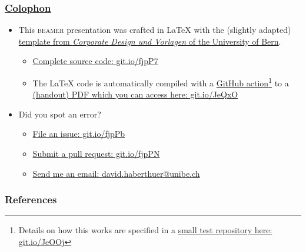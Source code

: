 \begin{frame}
	\frametitle{\href{https://en.wikipedia.org/wiki/Colophon_(publishing)}{Colophon}}
	\begin{itemize}
		\item This \textsc{beamer} presentation was crafted in \LaTeX\xspace with the (slightly adapted) \href{http://intern.unibe.ch/dienstleistungen/corporate_design_und_vorlagen/praesentationen/index_ger.html}{template from \emph{Corporate Design und Vorlagen} of the University of Bern}.
		\begin{itemize}
			\item \href{https://github.com/habi/lecture.microtomography/}{Complete source code: git.io/fjpP7}
			\item The \LaTeX\xspace code is automatically compiled with a \href{https://github.com/actions}{GitHub action}\footnote{Details on how this works are specified in a \href{https://github.com/habi/latex-test/}{small test repository here: git.io/JeOOj}} to a \href{https://habi.github.io/Lecture.Microtomography/XRayMicroTomography.Handout.pdf}{(handout) PDF which you can access here: git.io/JeQxO}
		\end{itemize}
		\item Did you spot an error?
		\begin{itemize}
			\item \href{https://github.com/habi/lecture.microtomography/issues}{File an issue: git.io/fjpPb}
			\item \href{https://github.com/habi/lecture.microtomography/pulls}{Submit a pull request: git.io/fjpPN}
			\item \href{mailto:david.haberthuer@unibe.ch?subject=Error\%20in\%20the\%20(micro)-tomography\%20lecture\&body=https://xkcd.com/386/}{Send me an email: david.haberthuer@unibe.ch}
		\end{itemize}
	\end{itemize}
\end{frame}

\begin{frame}[allowframebreaks]
	\frametitle{References}
	\renewcommand*{\bibfont}{\scriptsize}
	\printbibliography
\end{frame}


